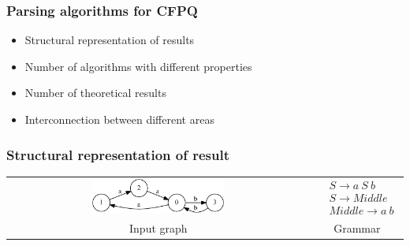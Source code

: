 \documentclass[xcolor=table]{beamer}
\begin{document}
\begin{frame} \frametitle{Parsing algorithms for CFPQ}
\begin{itemize}
\item Structural representation of results
\item Number of algorithms with different properties
\item Number of theoretical results
\pause
\item Interconnection between different areas
\end{itemize}
\end{frame}

\begin{frame}[fragile] \frametitle{Structural representation of result}
  \begin{center}
    \begin{tabular}{  c  c  }
        \includegraphics[width=0.45\textwidth]{pictures/input.pdf}
        &
    $

    \begin{array}{rl}
       & S \rightarrow a \ S \ b \\
       & S \rightarrow Middle \\
       & Middle \rightarrow a \ b
    \end{array}

    $
    \\
    Input graph
    &
    Grammar

    \end{tabular}
  \end{center}


\end{frame}
\end{document}
